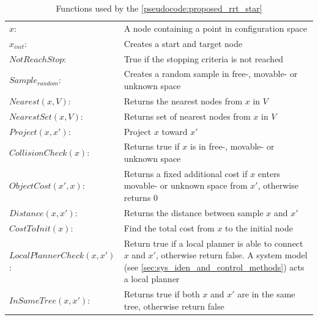 \begin{table}[H]
\centering
\begin{tabular}[t]{l p{10cm}}
$x$:& A node containing a point in configuration space\\
$x_{init}$:& Creates a start and target node\\ 
$NotReachStop$:& True if the stopping criteria is not reached\\ 
$Sample_{random}$:& Creates a random sample in free-, movable- or unknown space\\
$Nearest(x, V)$:& Returns the nearest nodes from $x$ in $V$\\
$NearestSet(x, V)$:& Returns set of nearest nodes from $x$ in $V$\\
$Project(x, x')$:& Project $x$ toward $x'$\\
$CollisionCheck(x)$:& Returns true if $x$ is in free-, movable- or unknown space\\
$ObjectCost(x', x)$:& Returns a fixed additional cost if $x$ enters movable- or unknown space from $x'$, otherwise returns 0\\
$Distance(x, x')$:& Returns the distance between sample $x$ and $x'$\\
$CostToInit(x)$:& Find the total cost from $x$ to the initial node\\
$LocalPlannerCheck(x, x')$:& Return true if a local planner is able to connect $x$ and $x'$, otherwise return false. A system model (see \cref{sec:sys_iden_and_control_methods}) acts a local planner\\
$InSameTree(x, x')$:& Returns true if both $x$ and $x'$ are in the same tree, otherwise return false\\
\end{tabular}
\caption{Functions used by the \cref{pseudocode:proposed_rrt_star}}
\label{table:functions_for_proposed_rrt_star}
\end{table}

